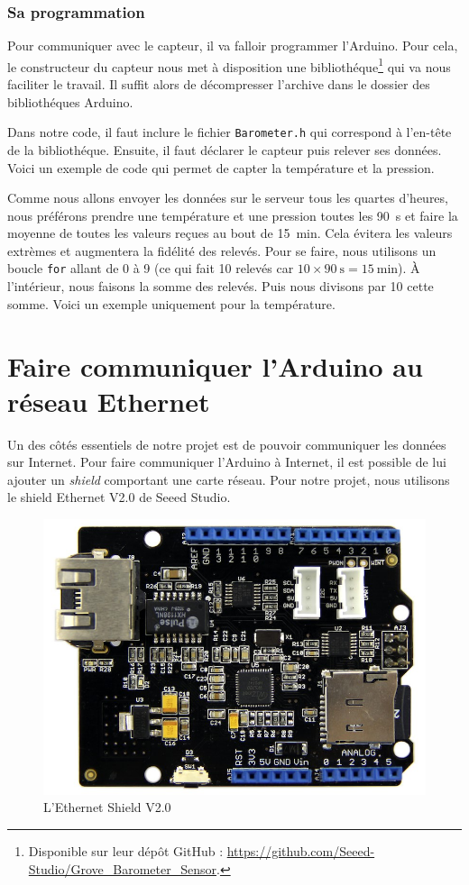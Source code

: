 \subsubsection{Sa programmation}

Pour communiquer avec le capteur, il va falloir programmer l'Arduino. Pour cela, le constructeur du capteur nous met à disposition une bibliothéque\footnote{Disponible sur leur dépôt GitHub : \url{https://github.com/Seeed-Studio/Grove_Barometer_Sensor}.} qui va nous faciliter le travail. Il suffit alors de décompresser l'archive dans le dossier des bibliothéques Arduino.

Dans notre code, il faut inclure le fichier \verb-Barometer.h- qui correspond à l'en-tête de la bibliothéque. Ensuite, il faut déclarer le capteur puis relever ses données. Voici un exemple de code qui permet de capter la température et la pression.


\Espace

Comme nous allons envoyer les données sur le serveur tous les quartes d'heures, nous préférons prendre une température et une pression toutes les \SI{90}{\second} et faire la moyenne de toutes les valeurs reçues au bout de \SI{15}{\minute}. Cela évitera les valeurs extrèmes et augmentera la fidélité des relevés. Pour se faire, nous utilisons un boucle \verb-for- allant de 0 à 9 (ce qui fait 10 relevés car $10 \times \SI{90}{\second} = \SI{15}{\minute}$). À l'intérieur, nous faisons la somme des relevés. Puis nous divisons par 10 cette somme. Voici un exemple uniquement pour la température.


\section{Faire communiquer l'Arduino au réseau Ethernet}

Un des côtés essentiels de notre projet est de pouvoir communiquer les données sur Internet. Pour faire communiquer l'Arduino à Internet, il est possible de lui ajouter un \emph{shield} comportant une carte réseau. Pour notre projet, nous utilisons le shield Ethernet V2.0 de Seeed Studio.

\begin{figure}
	\centering
	\includegraphics[width=.4\linewidth]{Images/Ethernet_Shield_V2-0}
	\caption{L'Ethernet Shield V2.0}
\end{figure}

